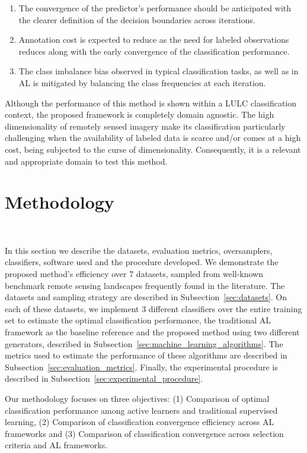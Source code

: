 \documentclass[parskip=full]{scrartcl}
\begin{document}
\begin{enumerate}
    \item The convergence of the predictor's performance should be anticipated
        with the clearer definition of the decision boundaries across
        iterations.
    \item Annotation cost is expected to reduce as the need for labeled
        observations reduces along with the early convergence of the
        classification performance.
    \item The class imbalance bias observed in typical classification tasks, as
        well as in AL is mitigated by balancing the class frequencies at each
        iteration.
\end{enumerate}

Although the performance of this method is shown within a LULC classification
context, the proposed framework is completely domain agnostic. The high
dimensionality of remotely sensed imagery make its classification particularly
challenging when the availability of labeled data is scarce and/or comes at a
high cost, being subjected to the curse of dimensionality. Consequently, it is a
relevant and appropriate domain to test this method.

\section{Methodology}~\label{sec:methodology}

In this section we describe the datasets, evaluation metrics, oversamplers,
classifiers, software used and the procedure developed. We demonstrate the
proposed method's efficiency over 7 datasets, sampled from well-known benchmark
remote sensing landscapes frequently found in the literature. The datasets and
sampling strategy are described in Subsection~\ref{sec:datasets}. On each of
these datasets, we implement 3 different classifiers over the entire training
set to estimate the optimal classification performance, the traditional AL
framework as the baseline reference and the proposed method using two different
generators, described in Subsection~\ref{sec:machine_learning_algorithms}. The
metrics used to estimate the performance of these algorithms are described in
Subsection~\ref{sec:evaluation_metrics}. Finally, the experimental procedure is
described in Subsection~\ref{sec:experimental_procedure}. 

Our methodology focuses on three objectives: (1) Comparison of optimal
classification performance among active learners and traditional supervised
learning, (2) Comparison of classification convergence efficiency across AL
frameworks and (3) Comparison of classification convergence across selection
criteria and AL frameworks.
\end{document}
